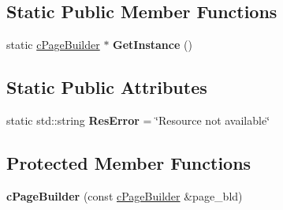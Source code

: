 \subsection*{Static Public Member Functions}
\begin{DoxyCompactItemize}
\item 
\hypertarget{classhttp__server_1_1cPageBuilder_acf7940105f1b4f5d77a0cecac9a69db6}{static \hyperlink{classhttp__server_1_1cPageBuilder}{c\-Page\-Builder} $\ast$ {\bfseries Get\-Instance} ()}\label{classhttp__server_1_1cPageBuilder_acf7940105f1b4f5d77a0cecac9a69db6}

\end{DoxyCompactItemize}
\subsection*{Static Public Attributes}
\begin{DoxyCompactItemize}
\item 
\hypertarget{classhttp__server_1_1cPageBuilder_ab72698e05f93aaa1c18f2f793b02df4d}{static std\-::string {\bfseries Res\-Error} = \char`\"{}Resource not available\char`\"{}}\label{classhttp__server_1_1cPageBuilder_ab72698e05f93aaa1c18f2f793b02df4d}

\end{DoxyCompactItemize}
\subsection*{Protected Member Functions}
\begin{DoxyCompactItemize}
\item 
\hypertarget{classhttp__server_1_1cPageBuilder_a3f3d04425b2f912c5616362b9be5d19e}{{\bfseries c\-Page\-Builder} (const \hyperlink{classhttp__server_1_1cPageBuilder}{c\-Page\-Builder} \&page\-\_\-bld)}\label{classhttp__server_1_1cPageBuilder_a3f3d04425b2f912c5616362b9be5d19e}

\end{DoxyCompactItemize}
